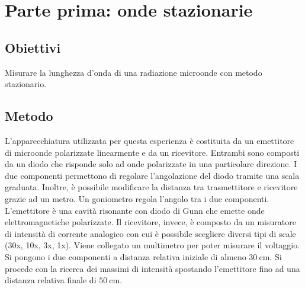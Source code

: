 \documentclass[a4paper]{article}
\begin{document}
\section{Parte prima: onde stazionarie}
\subsection{Obiettivi}
Misurare la lunghezza d'onda di una radiazione microonde con metodo stazionario.

\subsection{Metodo}
L'apparecchiatura utilizzata per questa esperienza è costituita da un emettitore di microonde polarizzate linearmente e da un ricevitore. Entrambi sono composti da un diodo che risponde solo ad onde polarizzate in una particolare direzione. I due componenti permettono di regolare l'angolazione del diodo tramite una scala graduata. Inoltre, è possibile modificare la distanza tra trasmettitore e ricevitore grazie ad un metro. Un goniometro regola l'angolo tra i due componenti.\\
L'emettitore è una cavità risonante con diodo di Gunn che emette onde elettromagnetiche polarizzate.
Il ricevitore, invece, è composto da un misuratore di intensità di corrente analogico con cui è possibile scegliere diversi tipi di scale (30x, 10x, 3x, 1x). Viene collegato un multimetro per poter misurare il voltaggio.\\

Si pongono i due componenti a distanza relativa iniziale di almeno $\SI{30}{\cm}$. Si procede con la ricerca dei massimi di intensità spostando l'emettitore fino ad una distanza relativa finale di $\SI{50}{\cm}$.\\
\end{document}
